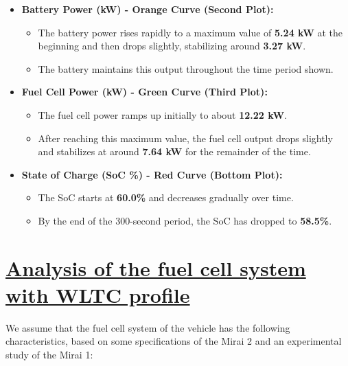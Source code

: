 \documentclass[12pt,a4paper]{article}
\numberwithin{equation}{section}
\begin{document}
{\begin{itemize}
	\item \textbf{Battery Power (kW) - Orange Curve (Second Plot):}
	\begin{itemize}
		\item The battery power rises rapidly to a maximum value of \textbf{5.24 kW} at the beginning and then drops slightly, stabilizing around \textbf{3.27 kW}.
		\item The battery maintains this output throughout the time period shown.
	\end{itemize}
	
	\item \textbf{Fuel Cell Power (kW) - Green Curve (Third Plot):}
	\begin{itemize}
		\item The fuel cell power ramps up initially to about \textbf{12.22 kW}.
		\item After reaching this maximum value, the fuel cell output drops slightly and stabilizes at around \textbf{7.64 kW} for the remainder of the time.
	\end{itemize}
	
	\item \textbf{State of Charge (SoC \%) - Red Curve (Bottom Plot):}
	\begin{itemize}
		\item The SoC starts at \textbf{60.0\%} and decreases gradually over time.
		\item By the end of the 300-second period, the SoC has dropped to \textbf{58.5\%}.
	\end{itemize}
\end{itemize}






\section{\underline{Analysis of the fuel cell system with WLTC profile}}

We assume that the fuel cell system of the vehicle has the following characteristics, based on some specifications of the Mirai 2 and an experimental study of the Mirai 1:

}
\end{document}
